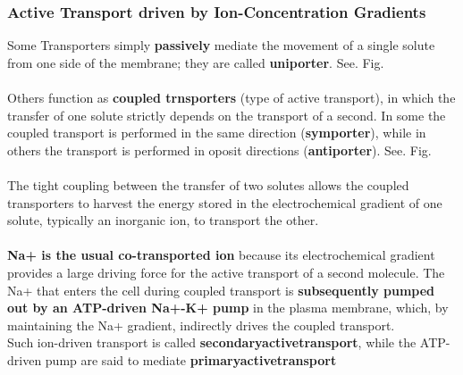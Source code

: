 \documentclass[../main.tex]{subfiles}
\begin{document}
\begin{figure}[H]
	\centering
	\caption{}
\end{figure}

\subsubsection{Active Transport driven by Ion-Concentration Gradients}
Some Transporters simply \textbf{passively} mediate the movement of a single solute from one side of the membrane; they are called \textbf{\gls{uniporter}}. See. Fig. \label{uniporters}\\
\\
Others function as \textbf{coupled trnsporters} (type of active transport), in which the transfer of one solute strictly depends on the transport of a second. In some the coupled transport is performed in the same direction (\textbf{\gls{symporter}}), while in others the transport is performed in oposit directions (\textbf{\gls{antiporter}}). See. Fig. \label{uniporters}\\
\\
The tight coupling between the transfer of two solutes allows the coupled transporters to harvest the energy stored in the electrochemical gradient of one solute, typically an inorganic ion, to transport the other. \\
\\
\textbf{Na+ is the usual co-transported ion} because its electrochemical gradient provides a large driving force for the active transport of a second molecule. The Na+ that enters the cell during coupled transport is \textbf{subsequently pumped out by an ATP-driven Na+-K+ pump} in the plasma membrane, which, by maintaining the Na+ gradient, indirectly drives the coupled transport. \\
Such ion-driven transport is called \textbf{\gls{secondaryactivetransport}}, while the ATP-driven pump are said to mediate \textbf{\gls{primaryactivetransport}} 	
\end{document}
